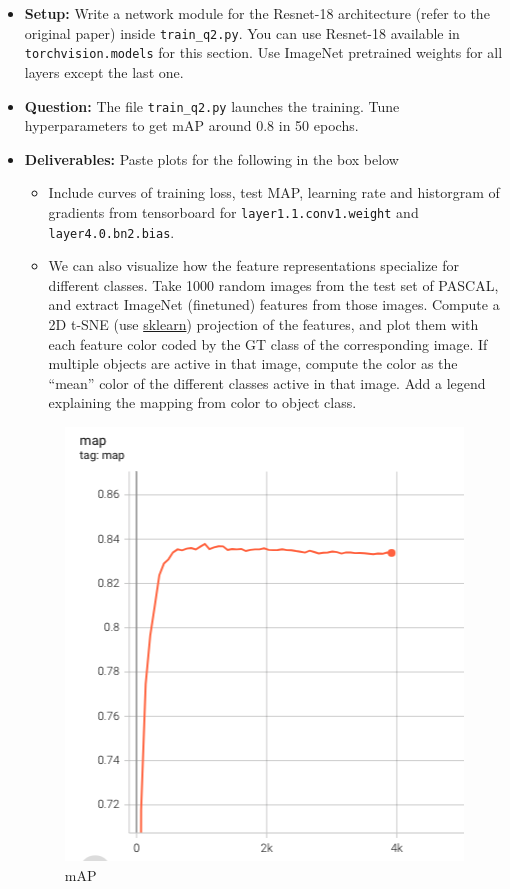 \documentclass[11pt,addpoints,answers]{exam}
\numberwithin{equation}{section} %
\numberwithin{figure}{section} %
\numberwithin{table}{section} %
\begin{document}
\begin{itemize}
    \item \textbf{Setup:} Write a network module for the Resnet-18 architecture (refer to the original paper) inside \texttt{train\_q2.py}. You can use Resnet-18 available in \texttt{torchvision.models} for this section.  Use ImageNet pretrained weights for all layers except the last one. 
    \item \textbf{Question:} The file \texttt{train\_q2.py} launches the training. Tune hyperparameters to get mAP around 0.8 in 50 epochs.
    \item \textbf{Deliverables:} Paste plots for the following in the box below
    \begin{itemize}
        \item Include curves of training loss, test MAP, learning rate and historgram of gradients from tensorboard for \texttt{layer1.1.conv1.weight} and \texttt{layer4.0.bn2.bias}. 
        \item We can also visualize how the feature representations specialize for different classes. Take 1000 random images from the test set of PASCAL, and extract ImageNet (finetuned) features from those images. Compute a 2D t-SNE (use \href{https://scikit-learn.org/stable/modules/generated/sklearn.manifold.TSNE.html}{sklearn}) projection of the features, and plot them with each feature color coded by the GT class of the corresponding image. If multiple objects are active in that image, compute the color as the ``mean” color of the different classes active in that image. Add a legend explaining the mapping from color to object class. 
    \end{itemize}

\begin{figure}[H]
\centering
\includegraphics[scale=0.7]{./results/q2/map.png}
\caption{mAP}
\label{fig:q2_map}
\end{figure}


\end{itemize}
\end{document}
